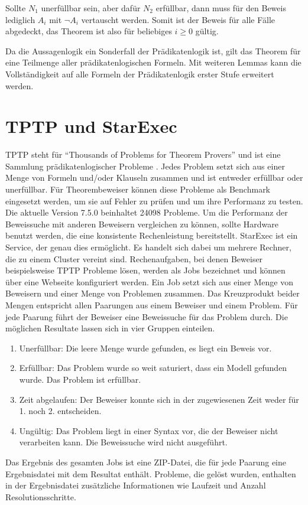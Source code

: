 Sollte $N_1$ unerfüllbar sein, aber dafür $N_2$ erfüllbar, dann muss für den Beweis lediglich $A_i$ mit $\neg A_i$ vertauscht werden. Somit ist der Beweis für alle Fälle abgedeckt, das Theorem ist also für beliebiges $i \geq 0$ gültig.

Da die Aussagenlogik ein Sonderfall der Prädikatenlogik ist, gilt das Theorem für eine Teilmenge aller prädikatenlogischen Formeln. Mit weiteren Lemmas kann die Vollständigkeit auf alle Formeln der Prädikatenlogik erster Stufe erweitert werden. \cite{Wos1965Sos}
		
	\section{TPTP und StarExec}
	
TPTP steht für "`Thousands of Problems for Theorem Provers"' und ist eine Sammlung prädikatenlogischer Probleme \cite{Sutcliff2021TPTP}. Jedes Problem setzt sich aus einer Menge von Formeln und/oder Klauseln zusammen und ist entweder erfüllbar oder unerfüllbar. Für Theorembeweiser können diese Probleme als Benchmark eingesetzt werden, um sie auf Fehler zu prüfen und um ihre Performanz zu testen. Die aktuelle Version 7.5.0 beinhaltet 24098 Probleme.
Um die Performanz der Beweissuche mit anderen Beweisern vergleichen zu können, sollte Hardware benutzt werden, die eine konsistente Rechenleistung bereitstellt. StarExec ist ein Service, der genau dies ermöglicht. Es handelt sich dabei um mehrere Rechner, die zu einem Cluster vereint sind. \cite{Sutcliff2022StarExec}
 Rechenaufgaben, bei denen Beweiser beispielsweise TPTP Probleme lösen, werden als Jobs bezeichnet und können über eine Webseite konfiguriert werden. Ein Job setzt sich aus einer Menge von Beweisern und einer Menge von Problemen zusammen. Das Kreuzprodukt beider Mengen entspricht allen Paarungen aus einem Beweiser und einem Problem. Für jede Paarung führt der Beweiser eine Beweissuche für das Problem durch. Die möglichen Resultate lassen sich in vier Gruppen einteilen. 
\begin{enumerate}
	\item Unerfüllbar: Die leere Menge wurde gefunden, es liegt ein Beweis vor.
	\item Erfüllbar: Das Problem wurde so weit saturiert, dass ein Modell gefunden wurde. Das Problem ist erfüllbar.
	\item Zeit abgelaufen: Der Beweiser konnte sich in der zugewiesenen Zeit weder für 1. noch 2. entscheiden.
	\item Ungültig: Das Problem liegt in einer Syntax vor, die der Beweiser nicht verarbeiten kann. Die Beweissuche wird nicht ausgeführt.
\end{enumerate}
Das Ergebnis des gesamten Jobs ist eine ZIP-Datei, die für jede Paarung eine Ergebnisdatei mit dem Resultat enthält. Probleme, die gelöst wurden, enthalten in der Ergebnisdatei zusätzliche Informationen wie Laufzeit und Anzahl Resolutionsschritte.
		
